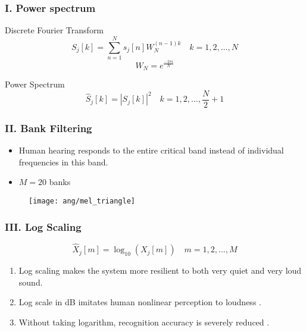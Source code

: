 
\begin{frame}
\frametitle{I. Power spectrum}

Discrete Fourier Transform
\begin{equation}
S_j[k] = \sum_{n=1}^{N} s_j[n] W_N^{(n-1) k} \quad k = 1, 2, \dots, N
\end{equation}
\begin{equation}
W_N = e^{\frac{- 2\pi i}{N}}
\end{equation}

Power Spectrum
\begin{equation}
\hat{S}_j[k] = |S_j[k]|^2 \quad k = 1, 2, \dots, \frac{N}{2} + 1
\end{equation}
\end{frame}


\begin{frame}
\frametitle{II. Bank Filtering}
\begin{itemize}
	\item Human hearing responds to the entire critical band instead of individual frequencies in this band.
	\item $M = 20$ banks
\end{itemize}

\begin{figure}[H]
\centering
\texttt{[image: ang/mel\_triangle]}
\end{figure}
\end{frame}


\begin{frame}
\frametitle{III. Log Scaling}
\begin{equation}
\hat{X}_j[m] = \log_{10}(X_j[m]) \quad m = 1, 2, \dots, M
\end{equation}

\begin{enumerate}
\item Log scaling makes the system more resilient to both very quiet and very loud sound.
\item Log scale in dB imitates human nonlinear perception to loudness \cite{farin2008mathematical}.
\item Without taking logarithm, recognition accuracy is severely reduced \cite{tan2008automatic}.
\end{enumerate}
\end{frame}


